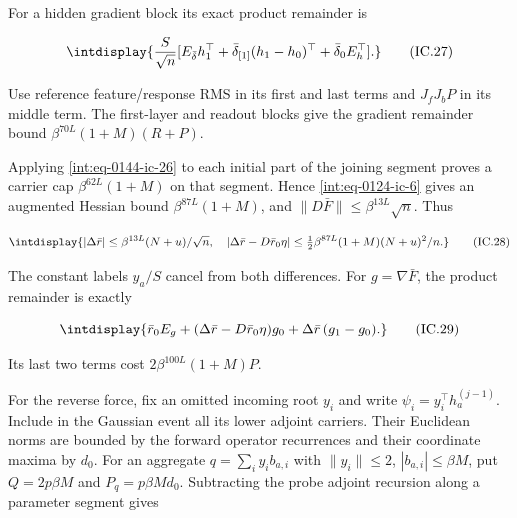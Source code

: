 
For a hidden gradient block its exact product remainder is


\begingroup\renewcommand{\theHequation}{intdisplay.327}
\begin{equation}
\intdisplay{
\frac{S}{\sqrt n}
 [E_{\bar\delta}h_1^\top+
   \bar\delta_{[1]}(h_1-h_0)^\top+\bar\delta_0E_h^\top].
}
\tag{IC.27}
\label{int:eq-0145-ic-27}
\end{equation}
\endgroup


Use reference feature/response RMS in its first and last terms and \(J_fJ_bP\) in its middle term. The first-layer and readout blocks give the gradient remainder bound \(\beta^{70L}(1+M)(R+P)\).



Applying \eqref{int:eq-0144-ic-26} to each initial part of the joining segment proves a carrier cap \(\beta^{62L}(1+M)\) on that segment. Hence \eqref{int:eq-0124-ic-6} gives an augmented Hessian bound \(\beta^{87L}(1+M)\), and \(\|D\bar F\|\le\beta^{13L}\sqrt n\). Thus


\begingroup\renewcommand{\theHequation}{intdisplay.328}
\begin{equation}
\intdisplay{
|\Delta\bar r|\le\beta^{13L}(N+u)/\sqrt n,\quad
 |\Delta\bar r-D\bar r_0\eta|
 \le\tfrac12\beta^{87L}(1+M)(N+u)^2/n.
}
\tag{IC.28}
\label{int:eq-0146-ic-28}
\end{equation}
\endgroup


The constant labels \(y_a/S\) cancel from both differences. For \(g=\nabla\bar F\), the product remainder is exactly


\begingroup\renewcommand{\theHequation}{intdisplay.329}
\begin{equation}
\intdisplay{
\bar r_0E_g+
 (\Delta\bar r-D\bar r_0\eta)g_0+
 \Delta\bar r\,(g_1-g_0).
}
\tag{IC.29}
\label{int:eq-0147-ic-29}
\end{equation}
\endgroup


Its last two terms cost \(2\beta^{100L}(1+M)P\).



For the reverse force, fix an omitted incoming root \(y_i\) and write \(\psi_i=y_i^\top h_a^{(j-1)}\). Include in the Gaussian event all its lower adjoint carriers. Their Euclidean norms are bounded by the forward operator recurrences and their coordinate maxima by \(d_0\). For an aggregate \(q=\sum_i y_ib_{a,\allowbreak i}\) with \(\|y_i\|\le2\), \(|b_{a,\allowbreak i}|\le\beta M\), put \(Q=2p\beta M\) and \(P_q=p\beta Md_0\). Subtracting the probe adjoint recursion along a parameter segment gives


